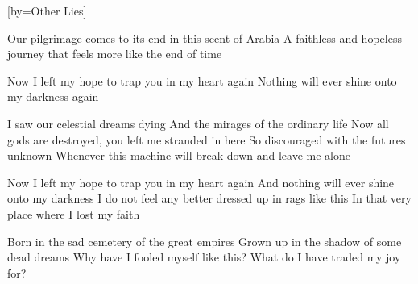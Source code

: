 [by={Other Lies}]

  \chordsoff
  \beginverse
  Our pilgrimage comes to its end in this scent of Arabia
  A faithless and hopeless journey that feels more like the end of time
  \endverse

  \beginchorus
  Now I left my hope to trap you in my heart again
  Nothing will ever shine onto my darkness again
  \endchorus

  \beginverse
  I saw our celestial dreams dying 
  And the mirages of the ordinary life 
  Now all gods are destroyed, you left me stranded in here
  So discouraged with the futures unknown
  Whenever this machine will break down and leave me alone
  \endverse

  \beginchorus  
  Now I left my hope to trap you in my heart again
  And nothing will ever shine onto my darkness
  I do not feel any better dressed up in rags like this
  In that very place where I lost my faith 
  \endchorus

  \beginverse  
  Born in the sad cemetery of the great empires
  Grown up in the shadow of some dead dreams
  Why have I fooled myself like this?
  What do I have traded my joy for?
  \endverse
\endsong
